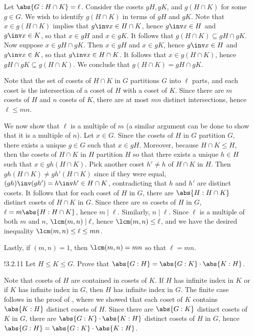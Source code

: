 \begin{sol} 
    Let $\abs{G : H \cap K} = \ell$.
	Consider the cosets $gH, gK$, and $g(H \cap K)$ for some $g \in G$.
	We wish to identify $g(H \cap K)$ in terms of $gH$ and $gK$.
	Note that $x \in g(H \cap K)$ implies that $g\inv x \in H \cap K$, hence $g\inv x \in H$ and $g\inv x \in K$, so that $x \in gH$ and $x \in gK$.
	It follows that $g(H \cap K) \subseteq gH \cap gK$.
	Now suppose $x \in gH \cap gK$.
	Then $x \in gH$ and $x \in gK$, hence $g\inv x \in H$ and $g\inv x \in K$, so that $g\inv x \in H \cap K$.
	It follows that $x \in g(H \cap K)$, hence $gH \cap gK \subseteq g(H \cap K)$.
	We conclude that $g(H \cap K) = gH \cap gK$.

    Note that the set of cosets of $H \cap K$ in $G$ partitions $G$ into $\ell$ parts, and each coset is the intersection of a coset of $H$ with a coset of $K$.
	Since there are $m$ cosets of $H$ and $n$ cosets of $K$, there are at most $mn$ distinct intersections, hence $\ell \leq mn$. 

    We now show that $\ell$ is a multiple of $m$ (a similar argument can be done to show that it is a multiple of $n$).
	Let $x \in G$.
	Since the cosets of $H$ in $G$ partition $G$, there exists a unique $g \in G$ such that $x \in gH$.
	Moreover, because $H \cap K \leq H$, then the cosets of $H \cap K$ in $H$ partition $H$ so that there exists a unique $h \in H$ such that $x \in gh(H \cap K)$.
	Pick another coset $h' \neq h$ of $H \cap K$ in $H$.
	Then $gh(H \cap K) \neq gh'(H \cap K)$ since if they were equal, $(gh)\inv(gh') = h\inv h' \in H \cap K$, contradicting that $h$ and $h'$ are distinct cosets.
	It follows that for each coset of $H$ in $G$, there are $\abs{H : H \cap K}$ distinct cosets of $H \cap K$ in $G$.
	Since there are $m$ cosets of $H$ in $G$, $\ell = m \abs{H : H \cap K}$, hence $m \mid \ell$.
	Similarly, $n \mid \ell$.
	Since $\ell$ is a multiple of both $m$ and $n$, $\lcm(m, n) \mid \ell$, hence $\lcm(m, n) \leq \ell$, and we have the desired inequality $\lcm(m, n) \leq \ell \leq mn$.

    Lastly, if $(m, n) = 1$, then $\lcm(m, n) = mn$ so that $\ell = mn$.
\end{sol}

\begin{exercise}!{3.2.11}
    Let $H \leq K \leq G$.
	Prove that $\abs{G : H} = \abs{G : K} \cdot \abs{K : H}$. 
\end{exercise}

\begin{sol}
    Note that cosets of $H$ are contained in cosets of $K$.
	If $H$ has infinite index in $K$ or if $K$ has infinite index in $G$, then $H$ has infinite index in $G$.
	The finite case follows in the proof of , where we showed that each coset of $K$ contains $\abs{K : H}$ distinct cosets of $H$.
	Since there are $\abs{G : K}$ distinct cosets of $K$ in $G$, there are $\abs{G : K} \cdot \abs{K : H}$ distinct cosets of $H$ in $G$, hence $\abs{G : H} = \abs{G : K} \cdot \abs{K : H}$.
\end{sol}

